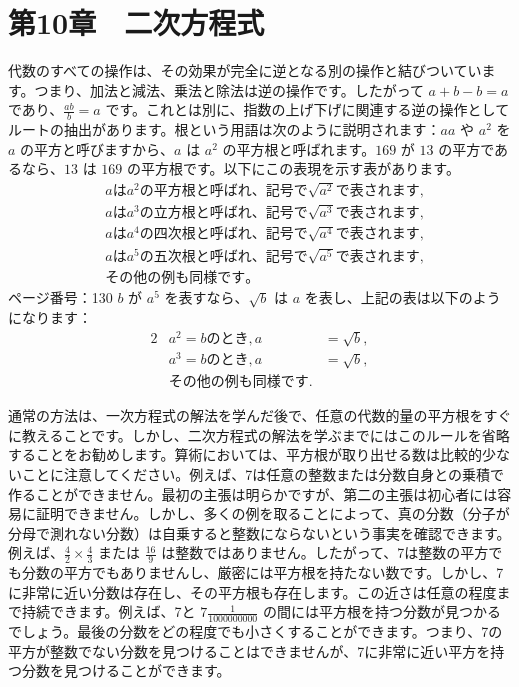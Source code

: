 \documentclass[a4paper,11pt,openany]{ltjsbook}
\begin{document}
\chapter{第10章　二次方程式}

代数のすべての操作は、その効果が完全に逆となる別の操作と結びついています。つまり、加法と減法、乗法と除法は逆の操作です。したがって $a + b - b = a$ であり、$\frac{ab}{b} = a$ です。これとは別に、指数の上げ下げに関連する逆の操作としてルートの抽出があります。根という用語は次のように説明されます：$aa$ や $a^2$ を $a$ の平方と呼びますから、$a$ は $a^2$ の平方根と呼ばれます。$169$ が $13$ の平方であるなら、$13$ は $169$ の平方根です。以下にこの表現を示す表があります。
\begin{align*}
& a は a^2  の平方根と呼ばれ、記号で \sqrt{a^2} で表されます, \\
& a は a^3  の立方根と呼ばれ、記号で \sqrt{a^3} で表されます, \\
& a は a^4  の四次根と呼ばれ、記号で \sqrt{a^4} で表されます, \\
& a は a^5  の五次根と呼ばれ、記号で \sqrt{a^5} で表されます, \\
& その他の例も同様です。
\end{align*}
ページ番号：130
$b$ が $a^5$ を表すなら、$\sqrt{b}$ は $a$ を表し、上記の表は以下のようになります：
\begin{alignat*}{2}
& a^2 = b のとき, a &= \sqrt{b}, \\
& a^3 = b のとき, a &= \sqrt{b}, \\
& その他の例も同様です.
\end{alignat*}

通常の方法は、一次方程式の解法を学んだ後で、任意の代数的量の平方根をすぐに教えることです。しかし、二次方程式の解法を学ぶまでにはこのルールを省略することをお勧めします。算術においては、平方根が取り出せる数は比較的少ないことに注意してください。例えば、7は任意の整数または分数自身との乗積で作ることができません。最初の主張は明らかですが、第二の主張は初心者には容易に証明できません。しかし、多くの例を取ることによって、真の分数（分子が分母で測れない分数）は自乗すると整数にならないという事実を確認できます。例えば、$\frac{4}{2} \times \frac{4}{3}$ または $\frac{16}{9}$ は整数ではありません。したがって、7は整数の平方でも分数の平方でもありませんし、厳密には平方根を持たない数です。しかし、7に非常に近い分数は存在し、その平方根も存在します。この近さは任意の程度まで持続できます。例えば、7と $7\frac{1}{1000000000}$ の間には平方根を持つ分数が見つかるでしょう。最後の分数をどの程度でも小さくすることができます。つまり、7の平方が整数でない分数を見つけることはできませんが、7に非常に近い平方を持つ分数を見つけることができます。
\end{document}
